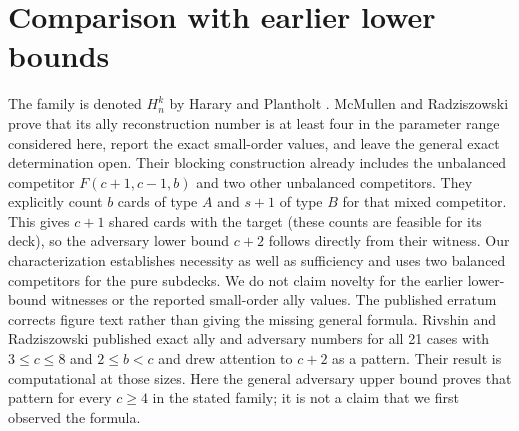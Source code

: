 \documentclass[11pt]{article}
\begin{document}
\section{Comparison with earlier lower bounds}\label{sec:prior}
The family is denoted $H_n^k$ by Harary and Plantholt \cite{HP}. McMullen and Radziszowski \cite[Section 2.2.4, Theorem 5 and Table 2]{MR} prove that its ally reconstruction number is at least four in the parameter range considered here, report the exact small-order values, and leave the general exact determination open. Their blocking construction already includes the unbalanced competitor $F(c+1,c-1,b)$ and two other unbalanced competitors. They explicitly count $b$ cards of type $A$ and $s+1$ of type $B$ for that mixed competitor. This gives $c+1$ shared cards with the target (these counts are feasible for its deck), so the adversary lower bound $c+2$ follows directly from their witness. Our characterization establishes necessity as well as sufficiency and uses two balanced competitors for the pure subdecks. We do not claim novelty for the earlier lower-bound witnesses or the reported small-order ally values. The published erratum \cite{Err} corrects figure text rather than giving the missing general formula. Rivshin and Radziszowski \cite[Section 2 and Table 5, pp.~177 and 180]{RR} published exact ally and adversary numbers for all 21 cases with $3\leq c\leq8$ and $2\leq b<c$ and drew attention to $c+2$ as a pattern. Their result is computational at those sizes. Here the general adversary upper bound proves that pattern for every $c\geq4$ in the stated family; it is not a claim that we first observed the formula.
\end{document}
